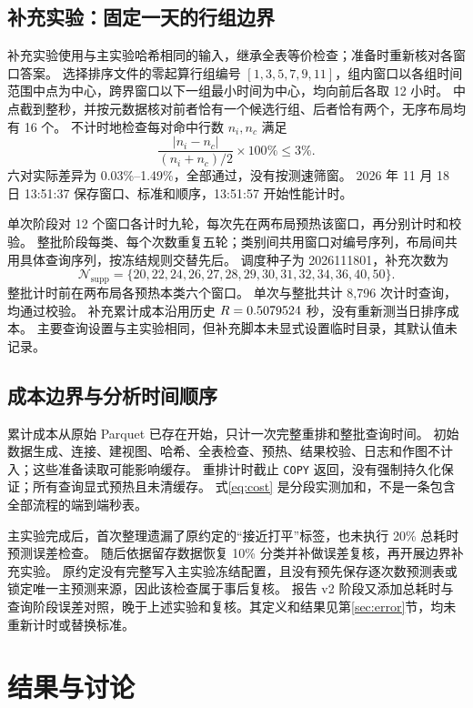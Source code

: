 \documentclass[UTF8,a4paper,zihao=-4,fontset=none]{ctexart}
\newcommand{\code}[1]{{\small\texttt{#1}}}
\newcommand{\pct}{\%}
\begin{document}
\subsection{补充实验：固定一天的行组边界}
\label{sec:supp-method}
补充实验使用与主实验哈希相同的输入，继承全表等价检查；准备时重新核对各窗口答案。
选择排序文件的零起算行组编号 $[1,3,5,7,9,11]$，组内窗口以各组时间范围中点为中心，跨界窗口以下一组最小时间为中心，均向前后各取 12 小时。
中点截到整秒，并按元数据核对前者恰有一个候选行组、后者恰有两个，无序布局均有 16 个。
不计时地检查每对命中行数 $n_i,n_c$ 满足
\begin{equation}
\frac{|n_i-n_c|}{(n_i+n_c)/2}\times100\pct\le3\pct.
\label{eq:matching}
\end{equation}
六对实际差异为 0.03\pct--1.49\pct，全部通过，没有按测速筛窗。
2026 年 11 月 18 日 13:51:37 保存窗口、标准和顺序，13:51:57 开始性能计时。

单次阶段对 12 个窗口各计时九轮，每次先在两布局预热该窗口，再分别计时和校验。
整批阶段每类、每个次数重复五轮；类别间共用窗口对编号序列，布局间共用具体查询序列，按冻结规则交替先后。
调度种子为 2026111801，补充次数为
\begin{equation*}
\mathcal N_{\mathrm{supp}}=\{20,22,24,26,27,28,29,30,31,32,34,36,40,50\}.
\end{equation*}
整批计时前在两布局各预热本类六个窗口。
单次与整批共计 8,796 次计时查询，均通过校验。
补充累计成本沿用历史 $R=0.5079524$ 秒，没有重新测当日排序成本。
主要查询设置与主实验相同，但补充脚本未显式设置临时目录，其默认值未记录。

\subsection{成本边界与分析时间顺序}
累计成本从原始 Parquet 已存在开始，只计一次完整重排和整批查询时间。
初始数据生成、连接、建视图、哈希、全表检查、预热、结果校验、日志和作图不计入；这些准备读取可能影响缓存。
重排计时截止 \code{COPY} 返回，没有强制持久化保证；所有查询显式预热且未清缓存。
式\eqref{eq:cost} 是分段实测加和，不是一条包含全部流程的端到端秒表。

主实验完成后，首次整理遗漏了原约定的“接近打平”标签，也未执行 20\pct{} 总耗时预测误差检查。
随后依据留存数据恢复 10\pct{} 分类并补做误差复核，再开展边界补充实验。
原约定没有完整写入主实验冻结配置，且没有预先保存逐次数预测表或锁定唯一主预测来源，因此该检查属于事后复核。
报告 v2 阶段又添加总耗时与查询阶段误差对照，晚于上述实验和复核。其定义和结果见第\ref{sec:error}节，均未重新计时或替换标准。

\section{结果与讨论}
\label{sec:results}
\end{document}
